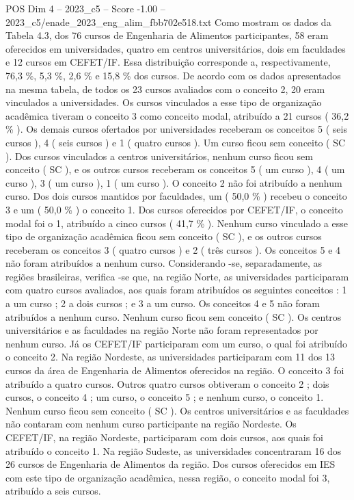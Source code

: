 \begin{textsample}{POS Dim 4 – 2023\_c5 – Score -1.00 – 2023\_c5/enade\_2023\_eng\_alim\_fbb702e518.txt}
Como mostram os dados da Tabela 4.3, dos 76 cursos de Engenharia de Alimentos participantes, 58 eram oferecidos em universidades, quatro em centros universitários, dois em faculdades e 12 cursos em CEFET/IF.
Essa distribuição corresponde a, respectivamente, 76,3 \%, 5,3 \%, 2,6 \% e 15,8 \% dos cursos.
De acordo com os dados apresentados na mesma tabela, de todos os 23 cursos avaliados com o conceito 2, 20 eram vinculados a universidades.
Os cursos vinculados a esse tipo de organização acadêmica tiveram o conceito 3 como conceito modal, atribuído a 21 cursos ( 36,2 \% ).
Os demais cursos ofertados por universidades receberam os conceitos 5 ( seis cursos ), 4 ( seis cursos ) e 1 ( quatro cursos ).
Um curso ficou sem conceito ( SC ).
Dos cursos vinculados a centros universitários, nenhum curso ficou sem conceito ( SC ), e os outros cursos receberam os conceitos 5 ( um curso ), 4 ( um curso ), 3 ( um curso ), 1 ( um curso ).
O conceito 2 não foi atribuído a nenhum curso.
Dos dois cursos mantidos por faculdades, um ( 50,0 \% ) recebeu o conceito 3 e um ( 50,0 \% ) o conceito 1.
Dos cursos oferecidos por CEFET/IF, o conceito modal foi o 1, atribuído a cinco cursos ( 41,7 \% ).
Nenhum curso vinculado a esse tipo de organização acadêmica ficou sem conceito ( SC ), e os outros cursos receberam os conceitos 3 ( quatro cursos ) e 2 ( três cursos ).
Os conceitos 5 e 4 não foram atribuídos a nenhum curso.
Considerando -se, separadamente, as regiões brasileiras, verifica -se que, na região Norte, as universidades participaram com quatro cursos avaliados, aos quais foram atribuídos os seguintes conceitos : 1 a um curso ; 2 a dois cursos ; e 3 a um curso.
Os conceitos 4 e 5 não foram atribuídos a nenhum curso.
Nenhum curso ficou sem conceito ( SC ).
Os centros universitários e as faculdades na região Norte não foram representados por nenhum curso.
Já os CEFET/IF participaram com um curso, o qual foi atribuído o conceito 2.
Na região Nordeste, as universidades participaram com 11 dos 13 cursos da área de Engenharia de Alimentos oferecidos na região.
O conceito 3 foi atribuído a quatro cursos.
Outros quatro cursos obtiveram o conceito 2 ; dois cursos, o conceito 4 ; um curso, o conceito 5 ; e nenhum curso, o conceito 1.
Nenhum curso ficou sem conceito ( SC ).
Os centros universitários e as faculdades não contaram com nenhum curso participante na região Nordeste.
Os CEFET/IF, na região Nordeste, participaram com dois cursos, aos quais foi atribuído o conceito 1.
Na região Sudeste, as universidades concentraram 16 dos 26 cursos de Engenharia de Alimentos da região.
Dos cursos oferecidos em IES com este tipo de organização acadêmica, nessa região, o conceito modal foi 3, atribuído a seis cursos.

\end{textsample}
